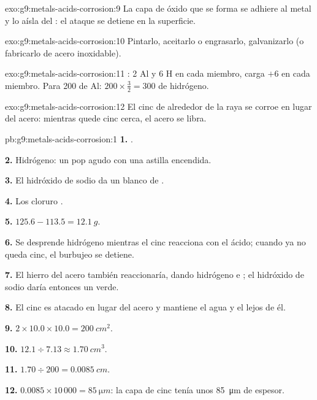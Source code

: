 \begin{solution}{exo:g9:metals-acids-corrosion:9}
La capa de óxido que se forma se adhiere al metal y lo aísla del : el
ataque se detiene en la superficie.
\end{solution}

\begin{solution}{exo:g9:metals-acids-corrosion:10}
Pintarlo, aceitarlo o engrasarlo, galvanizarlo (o fabricarlo de acero
inoxidable).
\end{solution}

\begin{solution}{exo:g9:metals-acids-corrosion:11}
: 2 Al y 6 H en cada
miembro, carga $+6$ en cada miembro. Para 200  de Al:
$200 \times \frac{3}{2} = 300$  de hidrógeno.
\end{solution}

\begin{solution}{exo:g9:metals-acids-corrosion:12}
El cinc de alrededor de la raya se corroe en lugar del acero: mientras
quede cinc cerca, el acero se libra.
\end{solution}

\begin{solution}{pb:g9:metals-acids-corrosion:1}
\textbf{1.} .

\textbf{2.} Hidrógeno: un pop agudo con una astilla encendida.

\textbf{3.} El hidróxido de sodio da un  blanco de
.

\textbf{4.} Los  cloruro .

\textbf{5.} $125.6 - 113.5 = \qty{12.1}{g}$.

\textbf{6.} Se desprende hidrógeno mientras el cinc reacciona con el
ácido; cuando ya no queda cinc, el burbujeo se detiene.

\textbf{7.} El hierro del acero también reaccionaría, dando hidrógeno e
 ; el hidróxido de sodio daría entonces un 
verde.

\textbf{8.} El cinc es atacado en lugar del acero y mantiene el agua y
el  lejos de él.

\textbf{9.} $2 \times 10.0 \times 10.0 = \qty{200}{cm^2}$.

\textbf{10.} $12.1 \div 7.13 \approx \qty{1.70}{cm^3}$.

\textbf{11.} $1.70 \div 200 = \qty{0.0085}{cm}$.

\textbf{12.} $0.0085 \times 10\,000 = \qty{85}{\micro m}$: la capa de
cinc tenía unos \qty{85}{\micro m} de espesor.
\end{solution}
